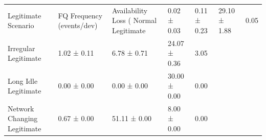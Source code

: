 \begin{tabular}{lllll}
\toprule
Legitimate Scenario & FQ Frequency (events/dev) & Availability Loss (%
\midrule
Normal Legitimate & 0.02 ± 0.03 & 0.11 ± 0.23 & 29.10 ± 1.88 & 0.05 \\
Irregular Legitimate & 1.02 ± 0.11 & 6.78 ± 0.71 & 24.07 ± 0.36 & 3.05 \\
Long Idle Legitimate & 0.00 ± 0.00 & 0.00 ± 0.00 & 30.00 ± 0.00 & 0.00 \\
Network Changing Legitimate & 0.67 ± 0.00 & 51.11 ± 0.00 & 8.00 ± 0.00 & 0.00 \\
\bottomrule
\end{tabular}
